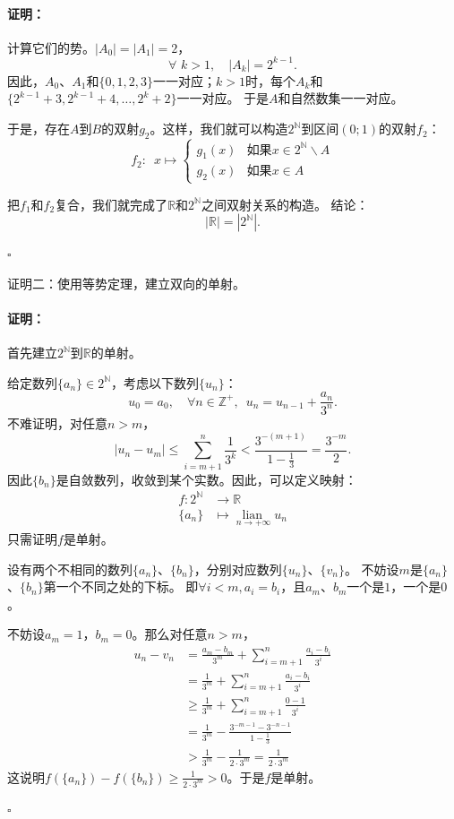 \documentclass[12pt,UTF8]{ctexbook}
\newcommand{\lian}[1]{
    \underset{#1}{\operatorname{lian}\,}
}
\theoremstyle{definition}
\theoremstyle{plain}
\renewenvironment{proof}{\paragraph{\textbf{证明：}}}{\hfill$\square$}
\begin{document}
\begin{appendix}
\begin{proof}
    计算它们的势。$|A_0| = |A_1| = 2$，
    $$ \forall \,\, k > 1, \quad |A_k| = 2^{k-1}. $$
    因此，$A_0$、$A_1$和$\{0,1,2,3\}$一一对应；$k>1$时，每个$A_k$和$\{2^{k-1}+3,2^{k-1}+4,\ldots, 2^k+2\}$一一对应。
    于是$A$和自然数集一一对应。

    于是，存在$A$到$B$的双射$g_2$。这样，我们就可以构造$2^\mathbb{N}$到区间$(0;1)$的双射$f_2$：
    $$ f_2:\,\,\,x\mapsto \left\{
        \begin{array}{cl}
            g_1(x) & \mbox{如果}x \in 2^\mathbb{N}\backslash A \\
            g_2(x) & \mbox{如果}x \in A 
        \end{array}\right.
    $$

    把$f_1$和$f_2$复合，我们就完成了$\mathbb{R}$和$2^\mathbb{N}$之间双射关系的构造。
    结论：
    $$ |\mathbb{R}| = |2^\mathbb{N}|. $$

\end{proof}

证明二：使用等势定理，建立双向的单射。

\begin{proof}
    首先建立$2^\mathbb{N}$到$\mathbb{R}$的单射。

    给定数列$\{a_n\}\in2^\mathbb{N}$，考虑以下数列$\{u_n\}$：
    $$ u_0 = a_0, \quad  \forall n\in \mathbb{Z}^+ , \,\,\, u_n = u_{n-1} + \frac{a_n}{3^n}. $$
    不难证明，对任意$n>m$，
    $$|u_n - u_m| \leqslant \sum_{i=m+1}^n \frac{1}{3^k} < \frac{3^{-(m+1)}}{1 - \frac{1}{3}} = \frac{3^{-m}}{2}.$$
    因此$\{b_n\}$是自敛数列，收敛到某个实数。因此，可以定义映射：
    \begin{align*}
        f : 2^\mathbb{N} &\rightarrow \mathbb{R}  \\
        \{a_n\} &\mapsto \lian{n\to +\infty} u_n 
    \end{align*}
    只需证明$f$是单射。

    设有两个不相同的数列$\{a_n\}$、$\{b_n\}$，分别对应数列$\{u_n\}$、$\{v_n\}$。
    不妨设$m$是$\{a_n\}$、$\{b_n\}$第一个不同之处的下标。
    即$\forall i<m, a_i = b_i$，且$a_m$、$b_m$一个是$1$，一个是$0$。

    不妨设$a_m = 1$，$b_m = 0$。那么对任意$n>m$，
    \begin{align*}
        u_n - v_n &= \frac{a_m - b_m}{3^m} + \sum_{i=m+1}^n \frac{a_i - b_i}{3^i}  \\
        &= \frac{1}{3^m} + \sum_{i=m+1}^n \frac{a_i - b_i}{3^i}  \\
        &\geqslant \frac{1}{3^m} + \sum_{i=m+1}^n \frac{0 - 1}{3^i}  \\
        &= \frac{1}{3^m} - \frac{3^{-m-1} - 3^{-n-1}}{1 - \frac{1}{3}}  \\
        &> \frac{1}{3^m} - \frac{1}{2\cdot 3^m} = \frac{1}{2\cdot 3^m} 
    \end{align*}
    这说明$f(\{a_n\}) - f(\{b_n\}) \geqslant \frac{1}{2\cdot 3^m} > 0$。于是$f$是单射。


\end{proof}
\end{appendix}
\end{document}
